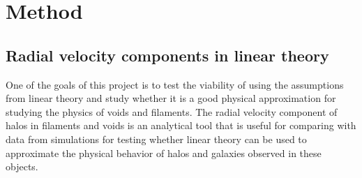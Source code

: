 \chapter{Method}\label{sec:method}
\section{Radial velocity components in linear theory}\label{sec:radlintheory}
One of the goals of this project is to test the viability of using the assumptions
from linear theory and study whether it is a good physical approximation for
studying the physics of voids and filaments. The radial velocity component of
halos in filaments and voids is an analytical tool that is useful for comparing
with data from simulations for testing whether linear theory can be used to
approximate the physical behavior of halos and galaxies observed in these objects.
